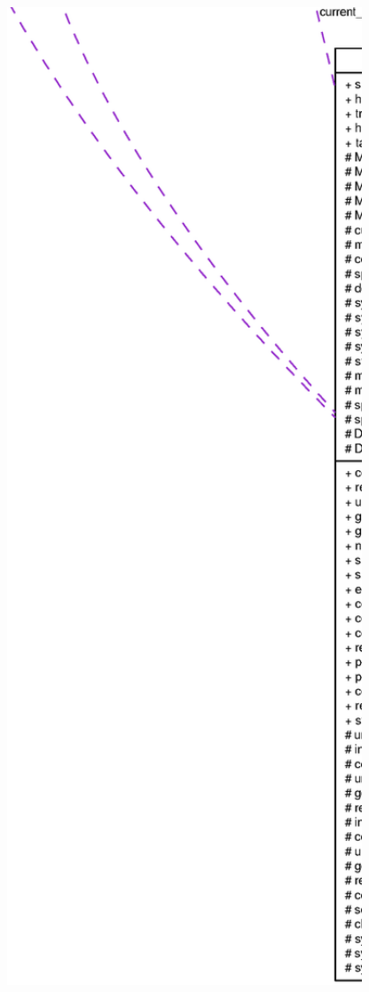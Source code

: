 \begin{figure}[H]
\begin{center}
\leavevmode
\includegraphics[width=400pt]{classprefetch__IP__t__coll__graph}
\end{center}
\end{figure}
